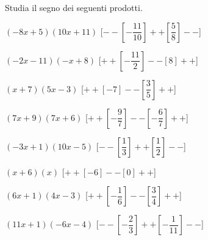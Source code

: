 \begin{esercizio}\label{ese:dis_5}
 Studia il segno dei seguenti prodotti.
 \begin{enumeratea}
  \item  \(\left(-8 x +5\right)\left(10 x +11\right)\) \hfill 
  [\(--\left [-\dfrac{11}{10} \right ]++\left [\dfrac{5}{8} \right ]--\)]
  \item  \(\left(-2 x -11\right)\left(- x +8\right)\) \hfill 
  [\(++\left [-\dfrac{11}{2} \right ]--\left [8 \right ]++\)]
  \item  \(\left(x +7\right)\left(5 x -3\right)\) \hfill 
  [\(++\left [-7 \right ]--\left [\dfrac{3}{5} \right ]++\)]
  \item  \(\left(7 x +9\right)\left(7 x +6\right)\) \hfill 
  [\(++\left [-\dfrac{9}{7} \right ]--\left [-\dfrac{6}{7} \right ]++\)]
  \item  \(\left(-3 x +1\right)\left(10 x -5\right)\) \hfill 
  [\(--\left [\dfrac{1}{3} \right ]++\left [\dfrac{1}{2} \right ]--\)]
  \item  \(\left(x +6\right)\left(x \right)\) \hfill 
  [\(++\left [-6 \right ]--\left [0 \right ]++\)]
  \item  \(\left(6 x +1\right)\left(4 x -3\right)\) \hfill 
  [\(++\left [-\dfrac{1}{6} \right ]--\left [\dfrac{3}{4} \right ]++\)]
  \item  \(\left(11 x +1\right)\left(-6 x -4\right)\) \hfill 
  [\(--\left [-\dfrac{2}{3} \right ]++\left [-\dfrac{1}{11} \right ]--\)]
 \end{enumeratea}
\end{esercizio}

